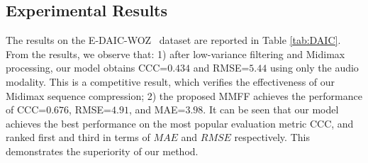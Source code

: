 \documentclass{article}
\begin{document}
\subsection{Experimental Results}
The results on the E-DAIC-WOZ~\cite{AVEC2019,DAIC} dataset are reported in Table \ref{tab:DAIC}. From the results, we observe that: 1) after low-variance filtering and Midimax processing, our model obtains CCC=$0.434$ and RMSE=$5.44$ using only the audio modality. This is a competitive result, which verifies the effectiveness of our Midimax sequence compression; 2) the proposed MMFF achieves the performance of CCC=$0.676$, RMSE=$4.91$, and MAE=$3.98$. It can be seen that our model achieves the best performance on the most popular evaluation metric CCC, and ranked first and third in terms of $MAE$ and $RMSE$ respectively. This demonstrates the superiority of our method.

\begin{table}[!t]
   	\centering
   	\caption{Result on E-DAIC-WOZ Test Set, where the best results are marked in bold, ``(T)'' and ``(A)'' indicate that the model only uses the corresponding modality. If not specified, all modalities are utilized.
   	} 
   	\label{tab:DAIC}
\end{table}
   	
\end{document}
